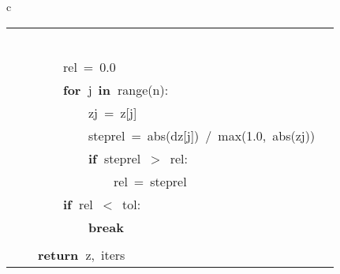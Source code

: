 \documentclass{article}\usepackage[]{graphicx}\usepackage[dvipsnames,table]{xcolor}
\makeatletter
\newcommand{\hlnum}[1]{\textcolor[rgb]{0.686,0.059,0.569}{#1}}%
\newcommand{\hlopt}[1]{\textcolor[rgb]{0,0,0}{#1}}%
\newcommand{\hldef}[1]{\textcolor[rgb]{0.345,0.345,0.345}{#1}}%
\newcommand{\hlkwa}[1]{\textcolor[rgb]{0.161,0.373,0.58}{\textbf{#1}}}%
\newcommand{\hlkwb}[1]{\textcolor[rgb]{0.69,0.353,0.396}{#1}}%
\newenvironment{kframe}{%
 \def\at@end@of@kframe{}%
 \ifinner\ifhmode%
  \def\at@end@of@kframe{\end{minipage}}%
  \begin{minipage}{\columnwidth}%
 \fi\fi%
 \def\FrameCommand##1{\hskip\@totalleftmargin \hskip-\fboxsep
 \colorbox{shadecolor}{##1}\hskip-\fboxsep
     \hskip-\linewidth \hskip-\@totalleftmargin \hskip\columnwidth}%
 \MakeFramed {\advance\hsize-\width
   \@totalleftmargin\z@ \linewidth\hsize
   \@setminipage}}%
 {\par\unskip\endMakeFramed%
 \at@end@of@kframe}
\newenvironment{knitrout}{}{} %
\makeatother
\begin{document}
\begin{center}
\begin{tabular}{c}
\begin{tabular}{m{10cm}m{10cm}}
\begin{minipage}[m]{10cm}
\begin{knitrout}
\begin{kframe}
\hldef{}\hspace*{\fill}\\
\hldef{}\hldef{\ \ \ \ \ \ \ \ }\hldef{}\hlslc{\#\ relative\ convergence}\hspace*{\fill}\\
\hldef{}\hldef{\ \ \ \ \ \ \ \ }\hldef{rel\ }\hlopt{=\ }\hldef{}\hlnum{0.0}\hspace*{\fill}\\
\hldef{}\hldef{\ \ \ \ \ \ \ \ }\hldef{}\hlkwa{for\ }\hldef{j\ }\hlkwa{in\ }\hldef{}\hlkwb{range}\hldef{}\hlopt{(}\hldef{n}\hlopt{):}\hspace*{\fill}\\
\hldef{}\hldef{\ \ \ \ \ \ \ \ \ \ \ \ }\hldef{zj\ }\hlopt{=\ }\hldef{z}\hlopt{{[}}\hldef{j}\hlopt{{]}}\hspace*{\fill}\\
\hldef{}\hldef{\ \ \ \ \ \ \ \ \ \ \ \ }\hldef{step\textunderscore rel\ }\hlopt{=\ }\hldef{}\hlkwb{abs}\hldef{}\hlopt{(}\hldef{dz}\hlopt{{[}}\hldef{j}\hlopt{{]})\ /\ }\hldef{}\hlkwb{max}\hldef{}\hlopt{(}\hldef{}\hlnum{1.0}\hldef{}\hlopt{,\ }\hldef{}\hlkwb{abs}\hldef{}\hlopt{(}\hldef{zj}\hlopt{))}\hspace*{\fill}\\
\hldef{}\hldef{\ \ \ \ \ \ \ \ \ \ \ \ }\hldef{}\hlkwa{if\ }\hldef{step\textunderscore rel\ }\hlopt{$>$\ }\hldef{rel}\hlopt{:}\hspace*{\fill}\\
\hldef{}\hldef{\ \ \ \ \ \ \ \ \ \ \ \ \ \ \ \ }\hldef{rel\ }\hlopt{=\ }\hldef{step\textunderscore rel}\hspace*{\fill}\\
\hldef{}\hldef{\ \ \ \ \ \ \ \ }\hldef{}\hlkwa{if\ }\hldef{rel\ }\hlopt{$<$\ }\hldef{tol}\hlopt{:}\hspace*{\fill}\\
\hldef{}\hldef{\ \ \ \ \ \ \ \ \ \ \ \ }\hldef{}\hlkwa{break}\hspace*{\fill}\\
\hldef{}\hspace*{\fill}\\
\hldef{}\hldef{\ \ \ \ }\hldef{}\hlkwa{return\ }\hldef{z}\hlopt{,\ }\hldef{iters}\hspace*{\fill}
\mbox{}
\normalfont
\end{kframe}
\end{knitrout}
\end{minipage}
&
\begin{minipage}[m]{10cm}
\begin{knitrout}\tiny

\end{knitrout}
\end{minipage}
\end{tabular}
\end{tabular}
\end{center}
\end{document}
